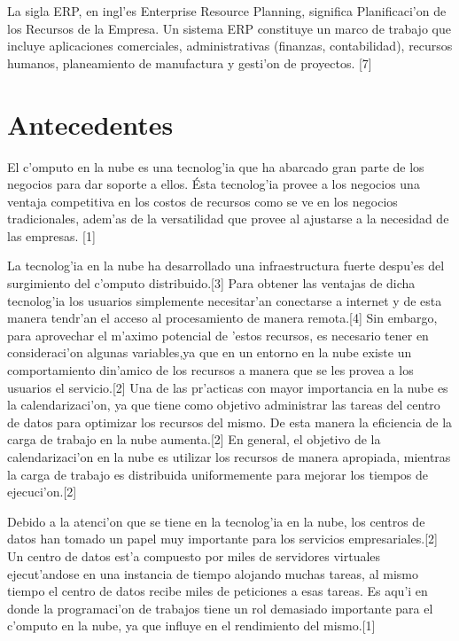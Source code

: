 La sigla ERP, en ingl'es Enterprise Resource Planning, significa Planificaci'on de los Recursos de la Empresa. Un sistema ERP constituye un marco de trabajo que incluye aplicaciones comerciales, administrativas (finanzas, contabilidad), recursos humanos, planeamiento de manufactura y gesti'on de proyectos. [7]


\section*{Antecedentes}

El c'omputo en la nube es una tecnolog'ia que ha abarcado gran parte de los negocios  para dar soporte a ellos. Ésta tecnolog'ia provee a los negocios una ventaja competitiva en los costos de recursos como se ve en los negocios tradicionales, adem'as de la versatilidad que provee al ajustarse a la necesidad de las empresas. [1]

La tecnolog'ia en la nube ha desarrollado una infraestructura fuerte despu'es del surgimiento del c'omputo distribuido.[3] Para obtener las ventajas de dicha tecnolog'ia los usuarios simplemente necesitar'an conectarse a internet y de esta manera tendr'an el acceso al procesamiento de manera remota.[4] Sin embargo, para aprovechar el m'aximo potencial de 'estos recursos, es necesario tener en consideraci'on algunas variables,ya que en un entorno en la nube existe un comportamiento din'amico de los recursos a manera que se les provea a los usuarios el servicio.[2]
Una de las pr'acticas con mayor importancia en la nube es la calendarizaci'on, ya que tiene como objetivo administrar las tareas del centro de datos para optimizar los recursos del mismo. De esta manera la eficiencia de la carga de trabajo en la nube aumenta.[2]
En general, el objetivo de la calendarizaci'on en la nube es utilizar los recursos de manera apropiada, mientras la carga de trabajo es distribuida uniformemente para mejorar los tiempos de ejecuci'on.[2]

Debido a la atenci'on que se tiene en la tecnolog'ia en la nube, los centros de datos han tomado un papel muy importante para los servicios empresariales.[2] Un centro de datos est'a compuesto por miles de servidores virtuales ejecut'andose en una instancia de tiempo alojando muchas tareas, al mismo tiempo el centro de datos recibe miles de peticiones a esas tareas. Es aqu'i en donde la programaci'on de trabajos tiene un rol demasiado importante para el c'omputo en la nube, ya que influye en el rendimiento del mismo.[1] 

